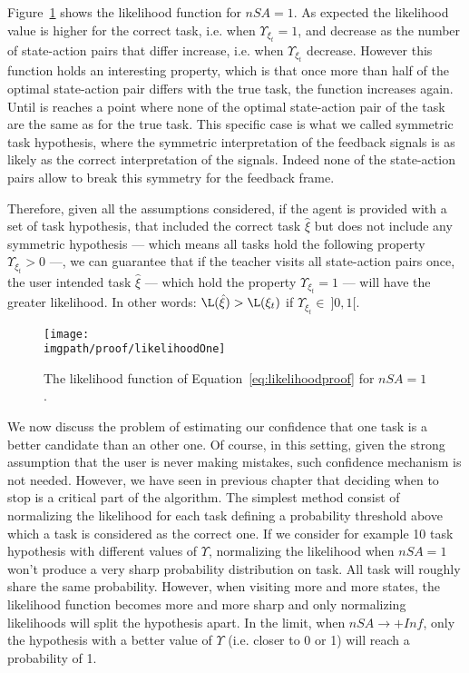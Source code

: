 Figure~\ref{fig:prooflikelihoodone} shows the likelihood function for $nSA = 1$. As expected the likelihood value is higher for the correct task, i.e. when $\Upsilon_{\xi_t} = 1$, and decrease as the number of state-action pairs that differ increase, i.e. when $\Upsilon_{\xi_t}$ decrease. However this function holds an interesting property, which is that once more than half of the optimal state-action pair differs with the true task, the function increases again. Until is reaches a point where none of the optimal state-action pair of the task are the same as for the true task. This specific case is what we called symmetric task hypothesis, where the symmetric interpretation of the feedback signals is as likely as  the correct interpretation of the signals. Indeed none of the state-action pairs allow to break this symmetry for the feedback frame. 

Therefore, given all the assumptions considered, if the agent is provided with a set of task hypothesis, that included the correct task $\hat{\xi}$ but does not include any symmetric hypothesis --- which means all tasks hold the following property $\Upsilon_{\xi_t} > 0$ ---, we can guarantee that if the teacher visits all state-action pairs once, the user intended task $\hat{\xi}$ --- which hold the property $\Upsilon_{\xi_t} = 1$ --- will have the greater likelihood. In other words: $\L(\hat{\xi}) > \L(\xi_t)$ if $\Upsilon_{\xi_t} \in~]0,1[$.

\begin{figure}[!htbp]
\centering
\texttt{[image: \\imgpath/proof/likelihoodOne]}
\caption{The likelihood function of Equation~\ref{eq:likelihoodproof} for $nSA =1$.}
\label{fig:prooflikelihoodone}
\end{figure}

We now discuss the problem of estimating our confidence that one task is a better candidate than an other one. Of course, in this setting, given the strong assumption that the user is never making mistakes, such confidence mechanism is not needed. However, we have seen in previous chapter that deciding when to stop is a critical part of the algorithm. The simplest method consist of normalizing the likelihood for each task defining a probability threshold above which a task is considered as the correct one. If we consider for example 10 task hypothesis with different values of $\Upsilon$, normalizing the likelihood when $nSA = 1$ won't produce a very sharp probability distribution on task. All task will roughly share the same probability. However, when visiting more and more states, the likelihood function becomes more and more sharp and only normalizing likelihoods will split the hypothesis apart. In the limit, when $nSA \rightarrow +Inf$, only the hypothesis with a better value of $\Upsilon$ (i.e. closer to 0 or 1) will reach a probability of 1.

